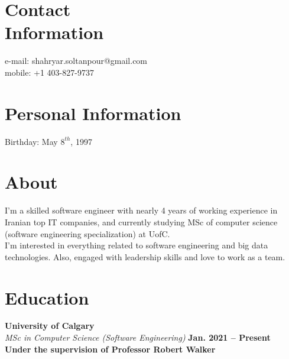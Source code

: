 \documentclass[line, mm]{sampleCV}
\begin{document}
\begin{resume}

    \section{\mysidestyle Contact\\Information}
    
   e-mail: shahryar.soltanpour@gmail.com\\
    mobile: +1 403-827-9737
    
    \section{\mysidestyle Personal Information}
   
    Birthday: May $8^{th}$, 1997

	\section{\mysidestyle About}
	I'm a skilled software engineer with nearly 4 years of working experience in Iranian top IT companies, and currently studying MSc of computer science (software engineering specialization) at UofC. \\
	I'm interested in everything related to software engineering and big data technologies. Also, engaged with leadership skills and love to work as a team. 
    
\section{\mysidestyle Education}
	\begin{list2}
	\setlength\itemsep{0.5em}
	\item \textbf{University of Calgary}\vspace{2mm}\\\vspace{1mm}
	\textsl{MSc in Computer Science (Software Engineering)} \hfill \textbf{ Jan. 2021 -- Present}\\ \textbf{Under the supervision of Professor Robert Walker}%
	

\end{list2}
\end{resume}
\end{document}
